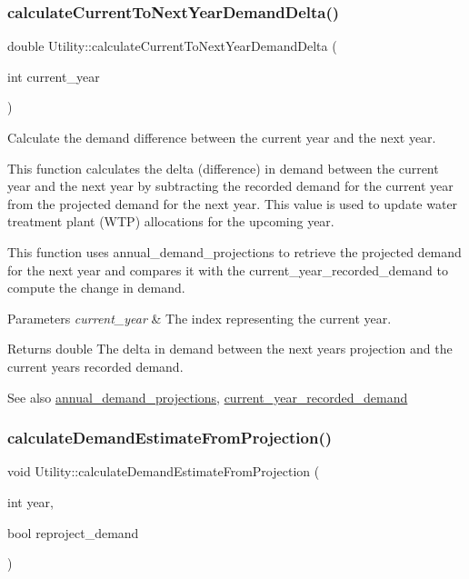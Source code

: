 \subsubsection{\texorpdfstring{calculate\+Current\+To\+Next\+Year\+Demand\+Delta()}{calculateCurrentToNextYearDemandDelta()}}
{\footnotesize\ttfamily double Utility\+::calculate\+Current\+To\+Next\+Year\+Demand\+Delta (\begin{DoxyParamCaption}\item[{int}]{current\+\_\+year }\end{DoxyParamCaption})}



Calculate the demand difference between the current year and the next year. 

This function calculates the delta (difference) in demand between the current year and the next year by subtracting the recorded demand for the current year from the projected demand for the next year. This value is used to update water treatment plant (W\+TP) allocations for the upcoming year.

This function uses annual\+\_\+demand\+\_\+projections to retrieve the projected demand for the next year and compares it with the current\+\_\+year\+\_\+recorded\+\_\+demand to compute the change in demand.


\begin{DoxyParams}{Parameters}
{\em current\+\_\+year} & The index representing the current year.\\
\hline
\end{DoxyParams}
\begin{DoxyReturn}{Returns}
double The delta in demand between the next year\textquotesingle{}s projection and the current year\textquotesingle{}s recorded demand.
\end{DoxyReturn}
\begin{DoxySeeAlso}{See also}
\mbox{\hyperlink{classUtility_af260b06faba5238fe33687eff5ff1570}{annual\+\_\+demand\+\_\+projections}}, \mbox{\hyperlink{classUtility_affc473409dadd1791e79aa9bbbe98dd2}{current\+\_\+year\+\_\+recorded\+\_\+demand}} 
\end{DoxySeeAlso}
\mbox{\label{classUtility_a10f96b2f34ba7e6e12a8e8fb98b8534a}} 
\subsubsection{\texorpdfstring{calculate\+Demand\+Estimate\+From\+Projection()}{calculateDemandEstimateFromProjection()}}
{\footnotesize\ttfamily void Utility\+::calculate\+Demand\+Estimate\+From\+Projection (\begin{DoxyParamCaption}\item[{int}]{year,  }\item[{bool}]{reproject\+\_\+demand }\end{DoxyParamCaption})}



